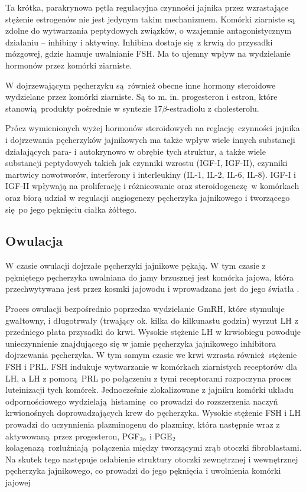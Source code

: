 \documentclass[two column, twoside, a4paper]{article}
\begin{document}
Ta krótka, parakrynowa pętla regulacyjna czynności jajnika przez wzrastające stężenie estrogenów nie jest jedynym takim mechanizmem. Komórki ziarniste są zdolne do wytwarzania peptydowych związków, o wzajemnie antagonistycznym działaniu -- inhibiny i aktywiny. Inhibina dostaje się z krwią do przysadki mózgowej, gdzie hamuje uwalnianie FSH. Ma to ujemny wpływ na wydzielanie hormonów przez komórki ziarniste. \autocite{Krzymowski2005, Woodruff1995, Findlay1993}

W dojrzewającym pęcherzyku są również obecne inne hormony steroidowe wydzielane przez komórki ziarniste. Są to m. in. progesteron i estron, które stanowią produkty pośrednie w syntezie 17$\beta$-estradiolu z cholesterolu.

Prócz wymienionych wyżej hormonów steroidowych na reglację czynności jajnika i dojrzewania pęcherzyków jajnikowych ma także wpływ wiele innych substancji działających para- i autokrynowo w obrębie tych struktur, a także wiele substancji peptydowych takich jak czynniki wzrostu (IGF-I, IGF-II), czynniki martwicy nowotworów, interferony i interleukiny (IL-1, IL-2, IL-6, IL-8). IGF-I i IGF-II wpływają na proliferację i różnicowanie oraz steroidogenezę w komórkach oraz biorą udział w regulacji angiogenezy pęcherzyka jajnikowego i tworzącego się po jego pęknięciu ciałka żółtego. \autocite{Krzymowski2005, Erickson1990, Gottshall1987, Alpizar1994}

\subsection{Owulacja}

W czasie owulacji dojrzałe pęcherzyki jajnikowe pękają. W tym czasie z pękniętego pęcherzyka uwalniana do jamy brzusznej jest komórka jajowa, która przechwytywana jest przez kosmki jajowodu i wprowadzana jest do jego światła \autocite{Sawicki2017}.

Proces owulacji bezpośrednio poprzedza wydzielanie GmRH, które stymuluje gwałtowny, i długotrwały (trwający ok. kilka do kilkunastu godzin) wyrzut LH z przedniego płata przysadki do krwi. Wysokie stężenie LH w krwiobiegu powoduje unieczynnienie znajdującego się w jamie pęcherzyka jajnikowego inhibitora dojrzewania pęcherzyka. W tym samym czasie we krwi wzrasta również stężenie FSH i PRL. FSH indukuje wytwarzanie w komórkach ziarnistych receptorów dla LH, a LH z pomocą PRL po połączeniu z tymi receptorami rozpoczyna proces luteinizacji tych komórek. Jednocześnie zlokalizowane z jajniku komórki układu odpornościowego wydzielają histaminę co prowadzi do rozszerzenia naczyń krwionośnych doprowadzających krew do pęcherzyka. Wysokie stężenie FSH i LH prowadzi do uczynnienia plazminogenu do plazminy, która następnie wraz z aktywowaną przez progesteron, PGF$_{2\alpha}$ i PGE$_{2}$ kolagenazą rozluźniają połączenia między tworzącymi zrąb otoczki fibroblastami. Na skutek tego następuje osłabienie struktury otoczki zewnętrznej i wewnętrznej pęcherzyka jajnikowego, co prowadzi do jego pęknięcia i uwolnienia komórki jajowej \autocite{Krzymowski2005,Sawicki2017}
\end{document}

